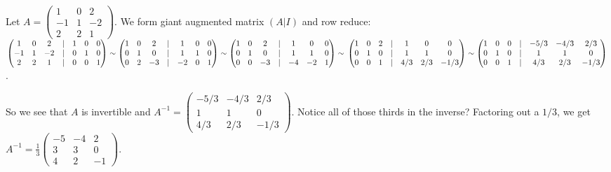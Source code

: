 \documentclass[12pt]{article}
\def\it{\item}
\def\Frac#1#2{\displaystyle{\frac{#1}{#2}}}
\begin{document}
\it Let $A = \begin{pmatrix} 1 & 0 & 2 \\ -1 & 1 & -2 \\ 2 & 2 & 1 \end{pmatrix}$. We form giant augmented matrix $(A | I)$ and row reduce: \\
$\begin{pmatrix} 1 & 0 & 2  & | & 1 & 0 & 0 \\ 
		-1 & 1 & -2 & | & 0 & 1 & 0 \\ 
		 2 & 2 & 1 & | & 0 & 0 & 1 \end{pmatrix} \sim
\begin{pmatrix} 1 & 0 &  2 & | &  1 & 0 & 0 \\ 
		0 & 1 &  0 & | &  1 & 1 & 0 \\ 
		0 & 2 & -3 & | & -2 & 0 & 1 \end{pmatrix} \sim
\begin{pmatrix} 1 & 0 &  2 & | &  1 &  0 & 0 \\ 
		0 & 1 &  0 & | &  1 &  1 & 0 \\ 
		0 & 0 & -3 & | & -4 & -2 & 1 \end{pmatrix} \sim \\
\begin{pmatrix} 1 & 0 & 2 & | &  1   &  0  & 0 \\ 
		0 & 1 & 0 & | &  1   &  1  & 0 \\ 
		0 & 0 & 1 & | &  4/3 & 2/3 & -1/3 \end{pmatrix} \sim 
\begin{pmatrix} 1 & 0 & 0 & | &  -5/3 & -4/3 & 2/3 \\ 
		0 & 1 & 0 & | &  1    &  1   & 0 \\ 
		0 & 0 & 1 & | &  4/3  & 2/3  & -1/3 \end{pmatrix}$.

So we see that $A$ is invertible and $A^{-1} = \begin{pmatrix} -5/3 & -4/3 & 2/3 \\ 1 & 1 & 0 \\ 4/3  & 2/3  & -1/3 \end{pmatrix}$. Notice all of those thirds in the inverse? Factoring out a $1/3$, we get $A^{-1} = \Frac{1}{3} \begin{pmatrix} -5 & -4 & 2 \\ 3 & 3 & 0 \\ 4 & 2 & -1 \end{pmatrix}$.
\end{document}
